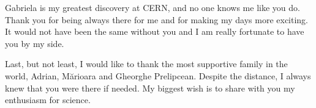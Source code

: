 \documentclass[encoding=utf8,british]{tumphthesis}
\begin{document}
Gabriela is my greatest discovery at CERN, and no one knows me like you do. Thank you for being always there for me and for making my days more exciting. It would not have been the same without you and I am really fortunate to have you by my side. 

Last, but not least, I would like to thank the most supportive family in the world, Adrian, M\u{a}rioara and Gheorghe Prelipcean. Despite the distance, I always knew that you were there if needed. My biggest wish is to share with you my enthusiasm for science.
\end{document}
